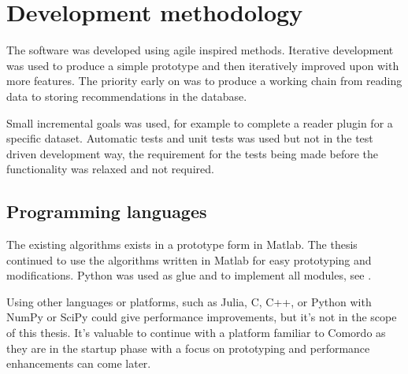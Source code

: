 \section{Development methodology}

The software was developed using agile inspired methods. Iterative development was used to produce a simple prototype and then iteratively improved upon with more features.  The priority early on was to produce a working chain from reading data to storing recommendations in the database.

Small incremental goals was used, for example to complete a reader plugin for a specific dataset.  Automatic tests and unit tests was used but not in the test driven development way, the requirement for the tests being made before the functionality was relaxed and not required.


\subsection{Programming languages}

The existing algorithms exists in a prototype form in Matlab. The thesis continued to use the algorithms written in Matlab for easy prototyping and modifications. Python was used as glue and to implement all modules, see .

Using other languages or platforms, such as Julia, C, C++, or Python with NumPy or SciPy could give performance improvements, but it's not in the scope of this thesis.  It's valuable to continue with a platform familiar to Comordo as they are in the startup phase with a focus on prototyping and performance enhancements can come later.


